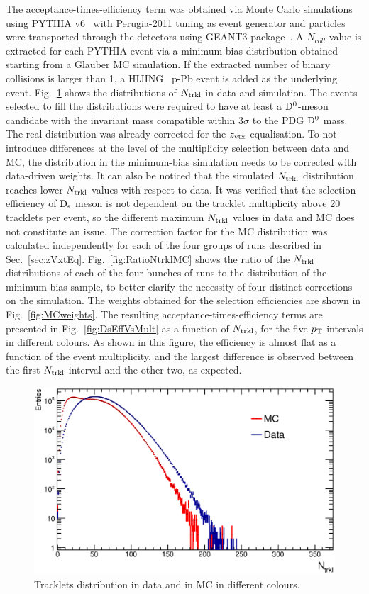 The acceptance-times-efficiency term was obtained via Monte Carlo simulations
using PYTHIA v6~\cite{Sjostrand:2006za} with Perugia-2011 tuning as event generator and 
particles were transported through the detectors using GEANT3 package~\cite{Brun:1994aa}.
A $N_{coll}$ value is extracted for each PYTHIA event via a minimum-bias 
distribution obtained starting from a Glauber MC simulation. If the 
extracted number of binary collisions is larger than 1, a HIJING~\cite{Wang:1991hta} p-Pb 
event is added as the underlying event. 
Fig.~\ref{fig:NtrklDataMC} shows the distributions of $N_{\rm trkl}$ in data and simulation.
The events selected to fill the distributions were required to have at least a ${\rm D^0}$-meson candidate 
with the invariant mass compatible within 3$\sigma$ to the PDG ${\rm D^0}$ mass.
The real distribution was already corrected for the $z_{\rm vtx}$ equalisation. 
To not introduce differences at the level of the multiplicity selection between data and MC, 
the distribution in the minimum-bias simulation needs to be corrected
with data-driven weights. It can also be noticed that
the simulated $N_{\rm trkl}$ distribution reaches
lower $N_{\rm trkl}$ values with respect to data. It was verified 
that the selection efficiency of ${\rm D_s}$ meson is not dependent on
the tracklet multiplicity above 20 tracklets per event, so the different
maximum $N_{\rm trkl}$ values in data and MC does not constitute an issue.
The correction factor for the MC distribution was calculated independently for each of the 
four groups of runs described in Sec.~\ref{sec:zVxtEq}. Fig.~\ref{fig:RatioNtrklMC}
shows the ratio of the $N_{\rm trkl}$ distributions of each of the four bunches
of runs to the distribution of the minimum-bias sample, to 
better clarify the necessity of four distinct corrections on the simulation.
The weights obtained for the selection efficiencies are shown in Fig.~\ref{fig:MCweights}.
The resulting acceptance-times-efficiency terms are presented in 
Fig.~\ref{fig:DsEffVsMult} as a function of $N_{\rm trkl}$, for the five $p_{\rm T}$ intervals
in different colours. As shown in this figure, the efficiency is almost flat 
as a function of the event multiplicity, and the largest difference is 
observed between the first $N_{\rm trkl}$ interval and the other two, as expected.


\begin{figure}[h]
\centering
 \includegraphics[width=.5\textwidth]{FigCap6/NtrkDistrDDataMC.eps}
 \caption{Tracklets distribution in data and in MC in different colours.}
 \label{fig:NtrklDataMC}
\end{figure}

